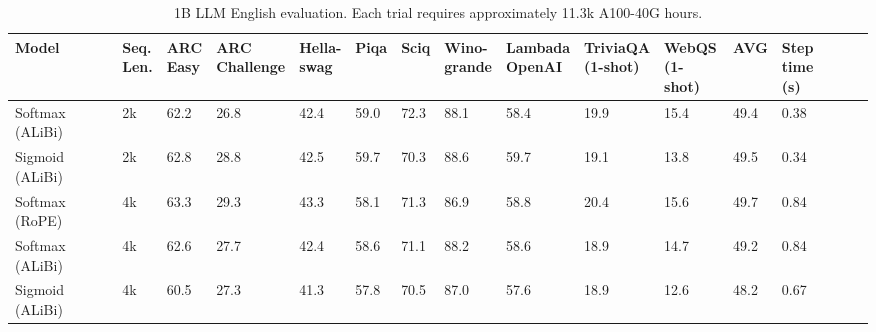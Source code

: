 \newpage

\begin{table}[ht]
\centering
\caption{1B LLM English evaluation. Each trial requires approximately 11.3k A100-40G hours.}
\label{tab:lm_results_rebuttal}
\begin{sc}
\begin{scriptsize}
\bgroup
\setlength{\tabcolsep}{.35em}
\begin{tabular}{@{}lllllllllllllll@{}}
\toprule
Model   & \makecell{Seq.\\Len.} & \makecell{ARC\\Easy} & \makecell{ARC\\Challenge} & \makecell{Hella-\\swag} & Piqa & Sciq & \makecell{Wino-\\grande} & \makecell{Lambada\\OpenAI} & \makecell{TriviaQA\\(1-shot)} & \makecell{WebQS\\(1-shot)} & AVG & \makecell{Step\\time (s)} \\ \midrule
Softmax (ALiBi) & 2k & 62.2       &     26.8           &    42.4       &  59.0    &   72.3   &     88.1       &     58.4           &      19.9             &    15.4            &    49.4   & 0.38   \\
Sigmoid (ALiBi) & 2k &  62.8       &      28.8         &    42.5       &  59.7    &   70.3   &     88.6       &      59.7          &       19.1            &   13.8             &       49.5  & 0.34   \\
\midrule
Softmax (RoPE) & 4k & 63.3       &     29.3           &    43.3       &  58.1    &   71.3   &     86.9       &     58.8           &  20.4             &    15.6            &    49.7   & 0.84   \\
Softmax (ALiBi) & 4k & 62.6       &     27.7           &    42.4       &  58.6    &   71.1   &     88.2       &     58.6           &      18.9             &    14.7            &    49.2   & 0.84   \\
Sigmoid (ALiBi) & 4k &  60.5       &      27.3         &    41.3       &  57.8    &   70.5   &     87.0       &      57.6          &       18.9            &   12.6             &       48.2  & 0.67   \\ \bottomrule
\end{tabular}
\egroup
\end{scriptsize}
\end{sc}
\vspace{-0.4cm}
\end{table}
